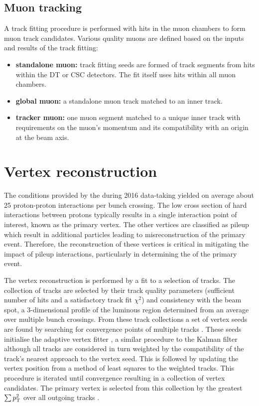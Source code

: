 \subsection{Muon tracking}\label{subsec:muon-tracking}

A track fitting procedure is performed with hits in the muon chambers to form muon track candidates. Various quality muons are defined based on the inputs and results of the track fitting:

\begin{itemize}
    \item \textbf{standalone muon:} track fitting seeds are formed of track segments from hits within the DT or CSC detectors. The fit itself uses hits within all muon chambers.
    \item \textbf{global muon:} a standalone muon track matched to an inner track.
    \item \textbf{tracker muon:} one muon segment matched to a unique inner track with requirements on the muon's momentum and its compatibility with an origin at the beam axis.
\end{itemize}


\section{Vertex reconstruction}\label{sec:vertex-reco}

The conditions provided by the \LHC during 2016 data-taking yielded on average about 25 proton-proton interactions per bunch crossing. The low cross section of hard interactions between protons typically results in a single interaction point of interest, known as the primary vertex. The other vertices are classified as pileup which result in additional particles leading to misreconstruction of the primary event. Therefore, the reconstruction of these vertices is critical in mitigating the impact of pileup interactions, particularly in determining the \ptmiss of the primary event.

The vertex reconstruction is performed by a fit to a selection of tracks. The collection of tracks are selected by their track quality parameters (sufficient number of hits and a satisfactory track fit $\chi^2$) and consistency with the beam spot, a 3-dimensional profile of the luminous region determined from an average over multiple bunch crossings. From these track collections a set of vertex seeds are found by searching for convergence points of multiple tracks \cite{Speer:927395}. These seeds initialise the adaptive vertex fitter \cite{Fruhwirth:1027031}, a similar procedure to the Kalman filter although all tracks are considered in turn weighted by the compatibility of the track's nearest approach to the vertex seed. This is followed by updating the vertex position from a method of least squares to the weighted tracks. This procedure is iterated until convergence resulting in a collection of vertex candidates. The primary vertex is selected from this collection by the greatest $\sum p_{\text{T}}^2$ over all outgoing tracks \cite{Sirunyan:2017ulk}.


